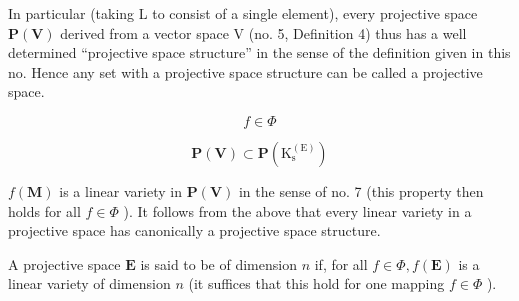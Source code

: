 In particular (taking L to consist of a single element), every projective space \(\mathbf{P}(\mathbf{V})\) derived from a vector space V (no. 5, Definition 4) thus has a well determined ``projective space structure'' in the sense of the definition given in this no. Hence any set with a projective space structure can be called a projective space.

\[
f \in \Phi
\]

\[
\mathbf {P} (\mathbf {V}) \subset \mathbf {P} \left(\mathrm{K} _ {\mathrm{s}} ^ {(\mathrm{E})}\right)
\]

\(f(\mathbf{M})\) is a linear variety in \(\mathbf{P}(\mathbf{V})\) in the sense of no. 7 (this property then holds for all \(f \in \Phi\) ). It follows from the above that every linear variety in a projective space has canonically a projective space structure.

A projective space \(\mathbf{E}\) is said to be of dimension \(n\) if, for all \(f\in\Phi,f(\mathbf{E})\) is a linear variety of dimension \(n\) (it suffices that this hold for one mapping \(f\in\Phi\) ).

